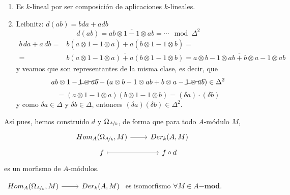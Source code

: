 \begin{dem}
\begin{enumerate}
    \item Es $k$-lineal por ser composici\'on de aplicaciones $k$-lineales. 
    \item Leibnitz: $d(ab) = bda + adb$
    $$d(ab) = \overline{ab \otimes 1 - 1 \otimes ab} = \cdots \mod \Delta^2$$
    \begin{align*}
        b \, da+ a\,  db = & b (\overline{a\otimes 1 - 1 \otimes a}) + a (\overline{b\otimes 1 - 1 \otimes b}) = \\
        = &  \overline{b(a\otimes 1 - 1 \otimes a) + a (b\otimes 1 - 1 \otimes b)} = \overline{a\otimes b -1 \otimes ab + b \otimes a - 1\otimes ab}
    \end{align*}
    y veamos que son representantes de la misma clase, es decir, que 
    $$ab \otimes 1 - \cancel{1 \otimes ab} - (a\otimes b -1 \otimes ab + b \otimes a - \cancel{1\otimes ab}) \in \Delta^2$$
    $$= (a\otimes 1 - 1\otimes a) (b \otimes 1 - 1 \otimes b) = (\delta a) \cdot (\delta b)$$
    y como $\delta a \in \Delta$ y $\delta b \in \Delta$, entonces $(\delta a)(\delta b) \in \Delta^2$. 
\end{enumerate}
\end{dem}
As\'i pues, hemos construido $d$ y $\Omega_{\nicefrac{A}{k}}$, de forma que para todo $A$-m\'odulo $M$, 
$$\bt Hom_{A}(\Omega_{\nicefrac{A}{k}}, M ) \rar &  Der_k(A, M) \\[-5mm] f\rarmaps & f\circ d \et$$
es un morfismo de $A$-m\'odulos.
\begin{teo}
    $\bt Hom_{A}(\Omega_{\nicefrac{A}{k}}, M ) \rar &  Der_k(A, M) \et$ es isomorfismo $\forall M \in A\mathbf{-mod}$. 
\end{teo}
